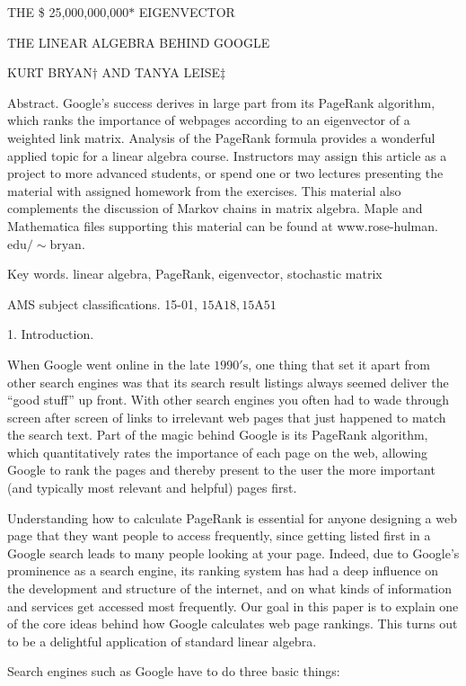\documentclass[a4paper,10pt]{article}
\begin{document}
THE {\$} 25,000,000,000$*$ EIGENVECTOR

THE LINEAR ALGEBRA BEHIND GOOGLE

KURT BRYAN$\dagger$ AND TANYA LEISE$\ddagger$

Abstract. Google's success derives in large part from its PageRank algorithm, which ranks the importance of webpages according to an eigenvector of a weighted link matrix. Analysis of the PageRank formula provides a wonderful applied topic for a linear algebra course. Instructors may assign this article as a project to more advanced students, or spend one or two lectures presenting the material with assigned homework from the exercises. This material also complements the discussion of Markov chains in matrix algebra. Maple and Mathematica files supporting this material can be found at www.rose-hulman. $\mathrm{e}\mathrm{d}\mathrm{u}/\sim \mathrm{b}\mathrm{r}\mathrm{y}\mathrm{a}\mathrm{n}$.

Key words. linear algebra, PageRank, eigenvector, stochastic matrix

AMS subject classifications. 15-01, $15\mathrm{A}18,15\mathrm{A}51$

1. Introduction.

When Google went online in the late $1990' \mathrm{s}$, one thing that set it apart from other search engines was that its search result listings always seemed deliver the ``good stuff'' up front. With other search engines you often had to wade through screen after screen of links to irrelevant web pages that just happened to match the search text. Part of the magic behind Google is its PageRank algorithm, which quantitatively rates the importance of each page on the web, allowing Google to rank the pages and thereby present to the user the more important (and typically most relevant and helpful) pages first.

Understanding how to calculate PageRank is essential for anyone designing a web page that they want people to access frequently, since getting listed first in a Google search leads to many people looking at your page. Indeed, due to Google's prominence as a search engine, its ranking system has had a deep influence on the development and structure of the internet, and on what kinds of information and services get accessed most frequently. Our goal in this paper is to explain one of the core ideas behind how Google calculates web page rankings. This turns out to be a delightful application of standard linear algebra.

Search engines such as Google have to do three basic things:
\end{document}
